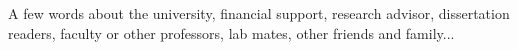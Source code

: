 
\section*{\acknowledgments}







A few words about the university, financial support, research advisor, dissertation readers, faculty or other professors, lab mates, other friends and family...

\cleardoublepage

